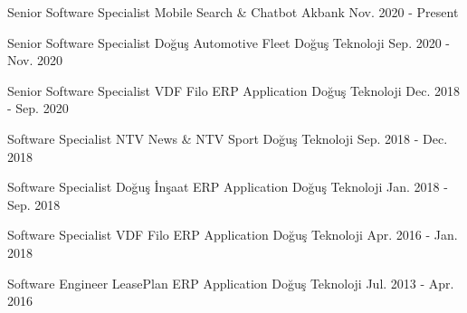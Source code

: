 

\begin{cventries}

  \cventry
    {Senior Software Specialist} %
    {Mobile Search \& Chatbot} %
    {Akbank} %
    {Nov. 2020 - Present} %
    {}

  \cventry
    {Senior Software Specialist} %
    {Doğuş Automotive Fleet} %
    {Doğuş Teknoloji} %
    {Sep. 2020 - Nov. 2020} %
    {}

  \cventry
    {Senior Software Specialist} %
    {VDF Filo ERP Application} %
    {Doğuş Teknoloji} %
    {Dec. 2018 - Sep. 2020} %
    {}

  \cventry
    {Software Specialist} %
    {NTV News \& NTV Sport} %
    {Doğuş Teknoloji} %
    {Sep. 2018 - Dec. 2018} %
    {}

  \cventry
    {Software Specialist} %
    {Doğuş İnşaat ERP Application} %
    {Doğuş Teknoloji} %
    {Jan. 2018 - Sep. 2018} %
    {}

  \cventry
    {Software Specialist} %
    {VDF Filo ERP Application} %
    {Doğuş Teknoloji} %
    {Apr. 2016 - Jan. 2018} %
    {}

  \cventry
    {Software Engineer} %
    {LeasePlan ERP Application} %
    {Doğuş Teknoloji} %
    {Jul. 2013 - Apr. 2016} %
    {}

\end{cventries}
